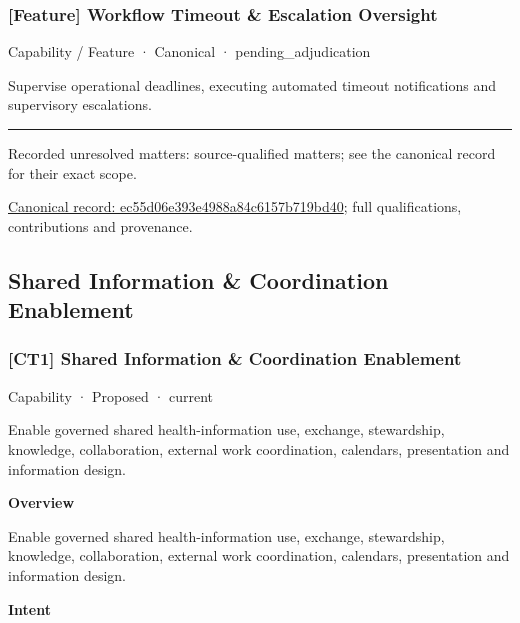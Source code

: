 \subsubsection{[Feature] Workflow Timeout \& Escalation Oversight}

\label{element:ec55d06e393e4988a84c6157b719bd40}
{\small Capability / Feature · Canonical · pending\_adjudication}\par

Supervise operational deadlines, executing automated timeout notifications and supervisory escalations.



\medskip\hrule\medskip

{\small Recorded unresolved matters: source-qualified matters; see the canonical record for their exact scope.}\par
{\footnotesize \href{../../../../continuum/strategy/capability/feature/ec55d06e393e4988a84c6157b719bd40.md}{Canonical record: ec55d06e393e4988a84c6157b719bd40}; full qualifications, contributions and provenance.}\par
\subsection{Shared Information \& Coordination Enablement}

\subsubsection{[CT1] Shared Information \& Coordination Enablement}

\label{element:0062fcacae1740988b6be2bda2aa1674}
{\small Capability · Proposed · current}\par

Enable governed shared health-information use, exchange, stewardship, knowledge, collaboration, external work coordination, calendars, presentation and information design.



\textbf{Overview}



Enable governed shared health-information use, exchange, stewardship, knowledge, collaboration, external work coordination, calendars, presentation and information design.



\textbf{Intent}



